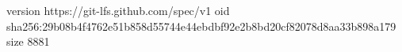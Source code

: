 version https://git-lfs.github.com/spec/v1
oid sha256:29b08b4f4762e51b858d55744e44ebdbf92e2b8bd20cf82078d8aa33b898a179
size 8881
